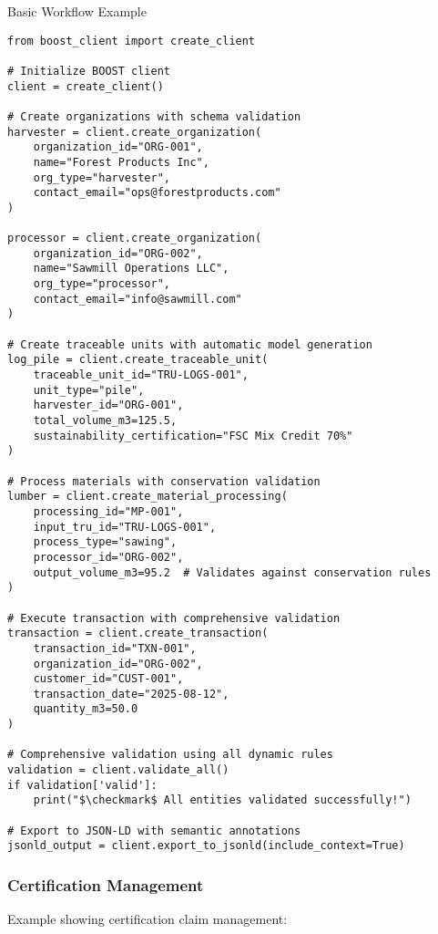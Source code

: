 \begin{pythonexample}{Basic Workflow Example}
\begin{verbatim}
from boost_client import create_client

# Initialize BOOST client
client = create_client()

# Create organizations with schema validation
harvester = client.create_organization(
    organization_id="ORG-001",
    name="Forest Products Inc",
    org_type="harvester",
    contact_email="ops@forestproducts.com"
)

processor = client.create_organization(
    organization_id="ORG-002", 
    name="Sawmill Operations LLC",
    org_type="processor",
    contact_email="info@sawmill.com"
)

# Create traceable units with automatic model generation
log_pile = client.create_traceable_unit(
    traceable_unit_id="TRU-LOGS-001",
    unit_type="pile",
    harvester_id="ORG-001",
    total_volume_m3=125.5,
    sustainability_certification="FSC Mix Credit 70%"
)

# Process materials with conservation validation
lumber = client.create_material_processing(
    processing_id="MP-001",
    input_tru_id="TRU-LOGS-001",
    process_type="sawing",
    processor_id="ORG-002",
    output_volume_m3=95.2  # Validates against conservation rules
)

# Execute transaction with comprehensive validation
transaction = client.create_transaction(
    transaction_id="TXN-001",
    organization_id="ORG-002",
    customer_id="CUST-001",
    transaction_date="2025-08-12",
    quantity_m3=50.0
)

# Comprehensive validation using all dynamic rules
validation = client.validate_all()
if validation['valid']:
    print("$\checkmark$ All entities validated successfully!")
    
# Export to JSON-LD with semantic annotations
jsonld_output = client.export_to_jsonld(include_context=True)
\end{verbatim}
\end{pythonexample}

\subsubsection{Certification Management}
\label{sec:python-certification}

Example showing certification claim management:

